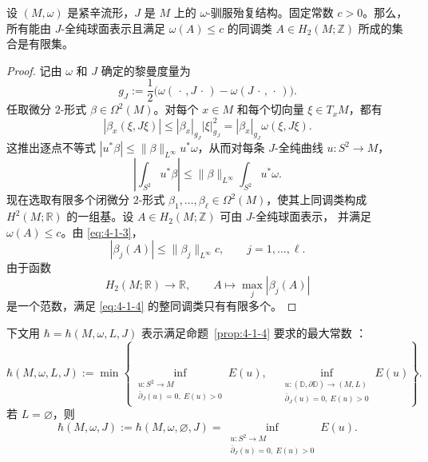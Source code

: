 \begin{proposition}\label{prop:4-1-5}
设 $(M,\omega)$ 是紧辛流形，$J$ 是 $M$ 上的 $\omega$-驯服殆复结构。固定常数
$c>0$。那么，所有能由 $J$-全纯球面表示且满足 $\omega(A)\le c$ 的同调类
$A\in H_2(M;\mathbb Z)$ 所成的集合是有限集。
\end{proposition}

\begin{proof}
记由 $\omega$ 和 $J$ 确定的黎曼度量为
\[
  g_J
  :=\frac12\bigl(\omega(\,\cdot\,,J\,\cdot\,)
  -\omega(J\,\cdot\,,\,\cdot\,)\bigr).
\]
任取微分 $2$-形式 $\beta\in\Omega^2(M)$。对每个 $x\in M$ 和每个切向量
$\xi\in T_xM$，都有
\[
  |\beta_x(\xi,J\xi)|
  \le |\beta_x|_{g_J}|\xi|_{g_J}^2
  =|\beta_x|_{g_J}\omega(\xi,J\xi).
\]
这推出逐点不等式
$|u^*\beta|\le\|\beta\|_{L^\infty}u^*\omega$，从而对每条 $J$-全纯曲线
$u:S^2\to M$，
\begin{equation}\label{eq:4-1-3}
  \left|\int_{S^2}u^*\beta\right|
  \le
  \|\beta\|_{L^\infty}\int_{S^2}u^*\omega.
\end{equation}
现在选取有限多个闭微分 $2$-形式
$\beta_1,\ldots,\beta_\ell\in\Omega^2(M)$，使其上同调类构成
$H^2(M;\mathbb R)$ 的一组基。设 $A\in H_2(M;\mathbb Z)$ 可由 $J$-全纯球面表示，
并满足 $\omega(A)\le c$。由 \eqref{eq:4-1-3}，
\begin{equation}\label{eq:4-1-4}
  |\beta_j(A)|
  \le \|\beta_j\|_{L^\infty}c,
  \qquad
  j=1,\ldots,\ell.
\end{equation}
由于函数
\[
  H_2(M;\mathbb R)\longrightarrow\mathbb R,
  \qquad
  A\longmapsto\max_j|\beta_j(A)|
\]
是一个范数，满足 \eqref{eq:4-1-4} 的整同调类只有有限多个。
\end{proof}

下文用 $\hbar=\hbar(M,\omega,L,J)$ 表示满足命题~\ref{prop:4-1-4} 要求的最大常数
：
\[
  \hbar(M,\omega,L,J)
  :=
  \min\left\{
  \inf_{\substack{u:S^2\to M\\
                  \bar\partial_J(u)=0,\ E(u)>0}}E(u),
  \quad
  \inf_{\substack{u:(\mathbb D,\partial\mathbb D)\to(M,L)\\
                  \bar\partial_J(u)=0,\ E(u)>0}}E(u)
  \right\}.
\]
若 $L=\varnothing$，则
\[
  \hbar(M,\omega,J)
  :=\hbar(M,\omega,\varnothing,J)
  =
  \inf_{\substack{u:S^2\to M\\
                  \bar\partial_J(u)=0,\ E(u)>0}}E(u).
\]
